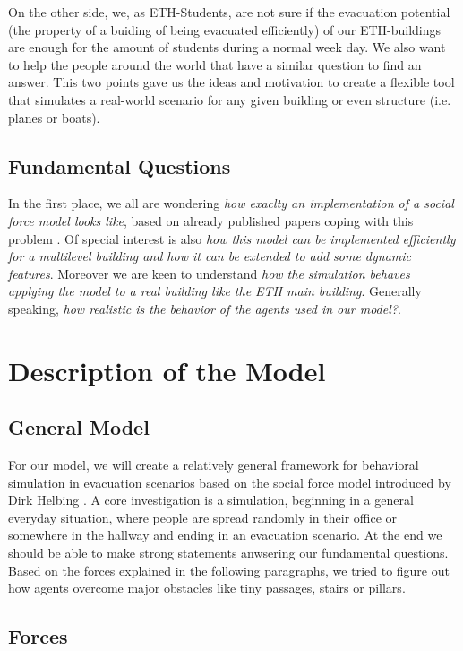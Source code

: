 \documentclass[11pt]{article}
\begin{document}
On the other side, we, as ETH-Students, are not sure if the evacuation potential
(the property of a buiding of being evacuated efficiently) of our ETH-buildings
are enough for the amount of students during a normal week day. We also want to
help the people around the world that have a similar question to find an answer.
This two points gave us the ideas and motivation to create a flexible tool that
simulates a real-world scenario for any given building or even structure (i.e.
planes or boats).


\subsection{Fundamental Questions}

In the first place, we all are wondering \textit{how exaclty an implementation
of a social force model looks like}, based on already published papers coping
with this problem \cite{SFMPD} \cite{SDFEP}. Of special interest is also
\textit{how this model can be implemented efficiently for a multilevel building
and how it can be extended to add some dynamic features}. Moreover we are keen
to understand \textit{how the simulation behaves applying the model to a real
building like the ETH main building}. Generally speaking, \textit{how realistic
is the behavior of the agents used in our model?}.

\section{Description of the Model}
\subsection{General Model}

For our model, we will create a relatively general framework for behavioral
simulation in evacuation scenarios based on the social force model introduced by Dirk Helbing \cite{SDFEP}.
A core investigation is a simulation, beginning in a general everyday situation,
where people are spread randomly in their office or somewhere in the hallway and ending in an evacuation scenario.
At the end we should be able to make strong
statements anwsering our fundamental questions.
Based on the forces explained in the following paragraphs, we tried to figure
out how agents overcome major obstacles like tiny passages, stairs or pillars.

\subsection {Forces}
\end{document}
